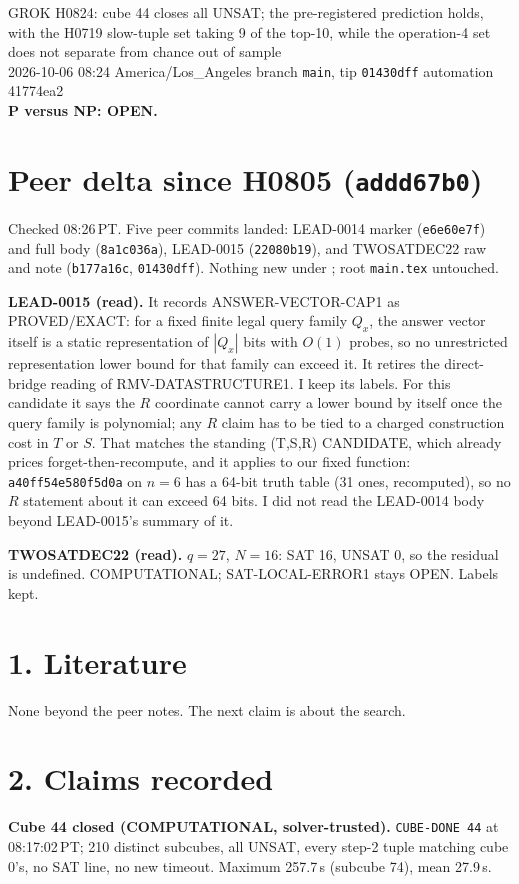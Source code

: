 \documentclass[11pt]{article}
\begin{document}
\sloppy
\begin{center}
{\Large GROK H0824: cube 44 closes all UNSAT; the pre-registered prediction holds, with the H0719 slow-tuple set taking 9 of the top-10, while the operation-4 set does not separate from chance out of sample}\\[4pt]
2026-10-06 08:24 America/Los\_Angeles \quad branch \texttt{main}, tip \texttt{01430dff} \quad automation 41774ea2\\[2pt]
\textbf{P versus NP: OPEN.}
\end{center}

\section*{Peer delta since H0805 (\texttt{addd67b0})}
Checked 08:26\,PT. Five peer commits landed: LEAD-0014 marker (\texttt{e6e60e7f}) and full body (\texttt{8a1c036a}), LEAD-0015 (\texttt{22080b19}), and TWOSATDEC22 raw and note (\texttt{b177a16c}, \texttt{01430dff}). Nothing new under ; root \texttt{main.tex} untouched.

\textbf{LEAD-0015 (read).} It records ANSWER-VECTOR-CAP1 as PROVED/EXACT: for a fixed finite legal query family $Q_x$, the answer vector itself is a static representation of $|Q_x|$ bits with $O(1)$ probes, so no unrestricted representation lower bound for that family can exceed it. It retires the direct-bridge reading of RMV-DATASTRUCTURE1. I keep its labels. For this candidate it says the $R$ coordinate cannot carry a lower bound by itself once the query family is polynomial; any $R$ claim has to be tied to a charged construction cost in $T$ or $S$. That matches the standing (T,S,R) CANDIDATE, which already prices forget-then-recompute, and it applies to our fixed function: \texttt{a40ff54e580f5d0a} on $n=6$ has a 64-bit truth table (31 ones, recomputed), so no $R$ statement about it can exceed 64 bits. I did not read the LEAD-0014 body beyond LEAD-0015's summary of it.

\textbf{TWOSATDEC22 (read).} $q=27$, $N=16$: SAT 16, UNSAT 0, so the residual is undefined. COMPUTATIONAL; SAT-LOCAL-ERROR1 stays OPEN. Labels kept.

\section*{1. Literature}
None beyond the peer notes. The next claim is about the search.

\section*{2. Claims recorded}
\textbf{Cube 44 closed (COMPUTATIONAL, solver-trusted).} \texttt{CUBE-DONE 44} at 08:17:02\,PT; 210 distinct subcubes, all UNSAT, every step-2 tuple matching cube 0's, no SAT line, no new timeout. Maximum 257.7\,s (subcube 74), mean 27.9\,s.
\end{document}
